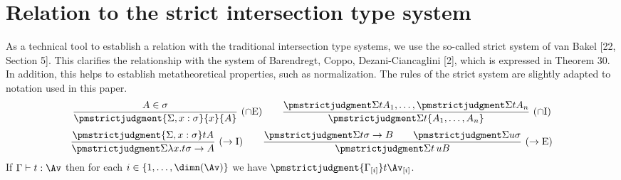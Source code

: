 \section*{Relation to the strict intersection type system}
As a technical tool to establish a relation with the traditional intersection type systems, we use the so-called strict system of van Bakel [22, Section 5]. This clarifies the relationship with the system of Barendregt, Coppo, Dezani-Ciancaglini [2], which is expressed in Theorem 30. In addition, this helps to establish metatheoretical properties, such as normalization.
The rules of the strict system are slightly adapted to notation used in this paper.
\[\frac{A\in\sigma}{\pmstrictjudgment{\Sigma,x:\sigma}{x}{A}}\ (\cap\mathrm E)\qquad
\frac{\pmstrictjudgment\Sigma t{A_1},\ldots,\pmstrictjudgment\Sigma t{A_n}}{\pmstrictjudgment\Sigma t{\{A_1,\ldots,A_n\}}}\ (\cap\mathrm I)\]
\[\frac{\pmstrictjudgment{\Sigma,x:\sigma}t A}{\pmstrictjudgment\Sigma{\lambda x.t}{\sigma\to A}}\ (\to\mathrm I)\qquad
\frac{\pmstrictjudgment\Sigma t{\sigma\to B}\qquad\pmstrictjudgment\Sigma u\sigma}{\pmstrictjudgment\Sigma{t\,u}B}\ (\to\mathrm E)\]
 If $\Gamma\vdash t:\Av$ then for each $i\in\{1,\ldots,\dimn(\Av)\}$ we have $\pmstrictjudgment{\Gamma_{[i]}}t{\Av_{[i]}}$.
